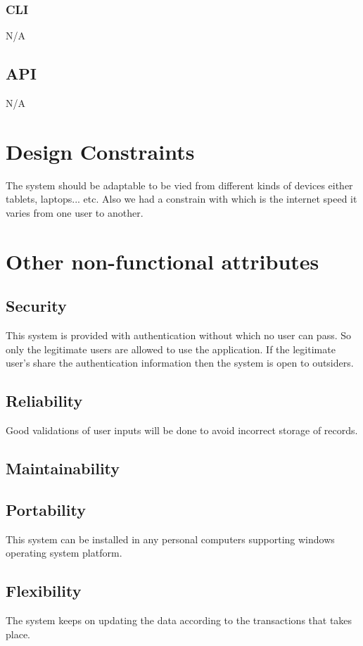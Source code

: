 \documentclass[]{article}
\begin{document}
\subsubsection { CLI}
N/A

\subsection {API}
N/A


\section{Design Constraints}
The system should be adaptable to be vied from different kinds of devices
either tablets, laptops... etc. Also we had a constrain with which is the
internet speed it varies from one user to another. 
\section{Other non-functional attributes}


\subsection {Security}
This system is provided with authentication without which no user can pass. So only the legitimate users are allowed to use the application. If the legitimate user’s share the authentication information then the system is open to outsiders.



\subsection {Reliability}
Good validations of user inputs will be done to avoid incorrect storage of records.
\subsection {Maintainability}



\subsection {Portability}
This system can be installed in any personal computers supporting windows operating system platform.
\subsection {Flexibility}
The system keeps on updating the data according to the transactions that takes place.
\end{document}
